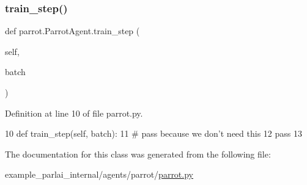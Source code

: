 \subsubsection{\texorpdfstring{train\+\_\+step()}{train\_step()}}
{\footnotesize\ttfamily def parrot.\+Parrot\+Agent.\+train\+\_\+step (\begin{DoxyParamCaption}\item[{}]{self,  }\item[{}]{batch }\end{DoxyParamCaption})}



Definition at line 10 of file parrot.\+py.


\begin{DoxyCode}
10     \textcolor{keyword}{def }train\_step(self, batch):
11         \textcolor{comment}{# pass because we don't need this}
12         \textcolor{keywordflow}{pass}
13 
\end{DoxyCode}


The documentation for this class was generated from the following file\+:\begin{DoxyCompactItemize}
\item 
example\+\_\+parlai\+\_\+internal/agents/parrot/\hyperlink{parrot_8py}{parrot.\+py}\end{DoxyCompactItemize}
